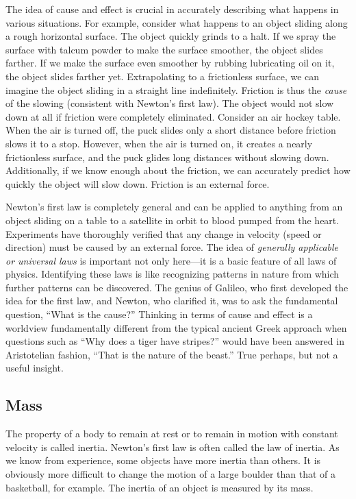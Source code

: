 \documentclass[
]{book}
\begin{document}
The idea of cause and effect is crucial in accurately describing what
happens in various situations. For example, consider what happens to an
object sliding along a rough horizontal surface. The object quickly
grinds to a halt. If we spray the surface with talcum powder to make the
surface smoother, the object slides farther. If we make the surface even
smoother by rubbing lubricating oil on it, the object slides farther
yet. Extrapolating to a frictionless surface, we can imagine the object
sliding in a straight line indefinitely. Friction is thus the \emph{cause}
\emph{}of the slowing (consistent with Newton's
first law). The object would not slow down at all if friction were
completely eliminated. Consider an air hockey table. When the air is
turned off, the puck slides only a short distance before friction slows
it to a stop. However, when the air is turned on, it creates a nearly
frictionless surface, and the puck glides long distances without slowing
down. Additionally, if we know enough about the friction, we can
accurately predict how quickly the object will slow down. Friction is an
external force.

Newton's first law is completely general and can be applied to anything
from an object sliding on a table to a satellite in orbit to blood
pumped from the heart. Experiments have thoroughly verified that any
change in velocity (speed or direction) must be caused by an external
force. The idea of \emph{generally applicable or universal laws} is important
not only here---it is a basic feature of all laws of physics.
Identifying these laws is like recognizing patterns in nature from which
further patterns can be discovered. The genius of Galileo, who first
developed the idea for the first law, and Newton, who clarified it, was
to ask the fundamental question, ``What is the cause?'' Thinking in terms
of cause and effect is a worldview fundamentally different from the
typical ancient Greek approach when questions such as ``Why does a tiger
have stripes?'' would have been answered in Aristotelian fashion, ``That
is the nature of the beast.'' True perhaps, but not a useful insight.

\hypertarget{fs-id1737594}{}
\hypertarget{mass}{%
\subsection{Mass}\label{mass}}

The property of a body to remain at rest or to remain in motion with
constant velocity is called \protect\hypertarget{import-auto-id2134480}{}{inertia}. Newton's first law is often called the \protect\hypertarget{import-auto-id1408275}{}{law of
inertia}. As we know from
experience, some objects have more inertia than others. It is obviously
more difficult to change the motion of a large boulder than that of a
basketball, for example. The inertia of an object is measured by its
\protect\hypertarget{import-auto-id1500464}{}{mass}.
\end{document}
